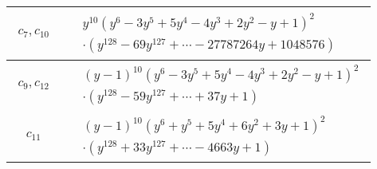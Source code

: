 \documentclass[1p]{elsarticle_modified}
\theoremstyle{definition}
\begin{document}
\begin{tabular}{m{50pt}|m{274pt}}
\hline $$\begin{aligned}c_{7},c_{10}\end{aligned}$$&$\begin{aligned}
&y^{10}(y^6-3 y^5+5 y^4-4 y^3+2 y^2- y+1)^2\\
&\cdot(y^{128}-69 y^{127}+\cdots-27787264 y+1048576)
\end{aligned}$\\
\hline $$\begin{aligned}c_{9},c_{12}\end{aligned}$$&$\begin{aligned}
&(y-1)^{10}(y^6-3 y^5+5 y^4-4 y^3+2 y^2- y+1)^2\\
&\cdot(y^{128}-59 y^{127}+\cdots+37 y+1)
\end{aligned}$\\
\hline $$\begin{aligned}c_{11}\end{aligned}$$&$\begin{aligned}
&(y-1)^{10}(y^6+y^5+5 y^4+6 y^2+3 y+1)^2\\
&\cdot(y^{128}+33 y^{127}+\cdots-4663 y+1)
\end{aligned}$\\
\hline
\end{tabular}
\vskip 2pc
\end{document}
